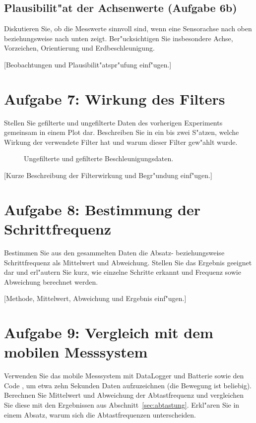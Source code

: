 \documentclass[a4paper,oneside,10pt]{article}%
\begin{document}
\subsection{Plausibilit"at der Achsenwerte (Aufgabe 6b)}
Diskutieren Sie, ob die Messwerte sinnvoll sind, wenn eine Sensorachse nach oben beziehungsweise nach unten zeigt. Ber"ucksichtigen Sie insbesondere Achse, Vorzeichen, Orientierung und Erdbeschleunigung.

[Beobachtungen und Plausibilit"atspr"ufung einf"ugen.]

\section{Aufgabe 7: Wirkung des Filters}
\label{sec:filter}

Stellen Sie gefilterte und ungefilterte Daten des vorherigen Experiments gemeinsam in einem Plot dar. Beschreiben Sie in ein bis zwei S"atzen, welche Wirkung der verwendete Filter hat und warum dieser Filter gew"ahlt wurde.

\begin{figure}[H]
\centering
{}
\caption{Ungefilterte und gefilterte Beschleunigungsdaten.}
\label{fig:filtervergleich}
\end{figure}

[Kurze Beschreibung der Filterwirkung und Begr"undung einf"ugen.]

\section{Aufgabe 8: Bestimmung der Schrittfrequenz}
\label{sec:schrittfrequenz}

Bestimmen Sie aus den gesammelten Daten die Absatz- beziehungsweise Schrittfrequenz als Mittelwert und Abweichung. Stellen Sie das Ergebnis geeignet dar und erl"autern Sie kurz, wie einzelne Schritte erkannt und Frequenz sowie Abweichung berechnet werden.

[Methode, Mittelwert, Abweichung und Ergebnis einf"ugen.]

\section{Aufgabe 9: Vergleich mit dem mobilen Messsystem}
\label{sec:mobil}

Verwenden Sie das mobile Messsystem mit DataLogger und Batterie sowie den Code , um etwa zehn Sekunden Daten aufzuzeichnen (die Bewegung ist beliebig). Berechnen Sie Mittelwert und Abweichung der Abtastfrequenz und vergleichen Sie diese mit den Ergebnissen aus Abschnitt~\ref{sec:abtastung}. Erkl"aren Sie in einem Absatz, warum sich die Abtastfrequenzen unterscheiden.
\end{document}
